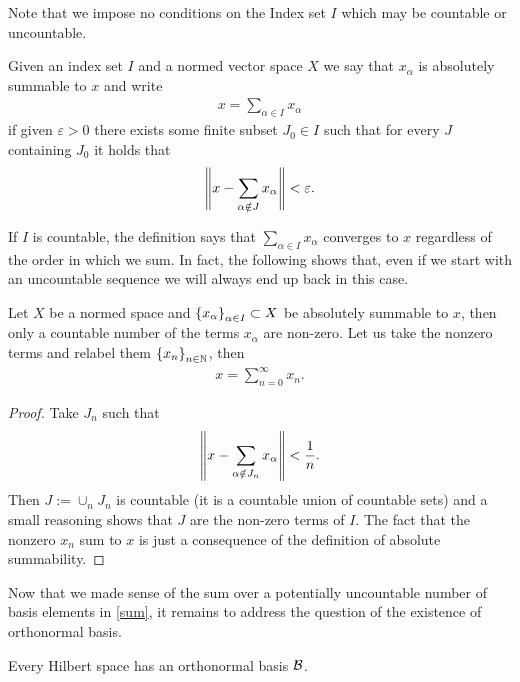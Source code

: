 \documentclass[
    a4paper,
    DIV=14,
    abstract=true,
    numbers=noenddot
]{scrartcl}
\begin{document}
	Note that we impose no conditions on the Index set $I$ which may be countable or uncountable.
	\begin{definition}
		Given an index set $I$ and a normed vector space $X$ we say that $x_\alpha$ is absolutely summable to $x$ and write
		\begin{align*}
			x= \sum_{\alpha\in I}x_\alpha
		\end{align*}
		if given $\varepsilon >0$ there exists some finite subset $J_0 \in I$ such that for every $J$ containing  $J_0$ it holds that
		\begin{align*}
			\left\lVert x-\sum_{\alpha\notin J} x_\alpha \right\rVert<\varepsilon  .
		\end{align*}
	\end{definition}
	If $I$ is countable, the definition says that $\sum_{\alpha \in I} x_\alpha$ converges to $x$ regardless of the order in which we sum. In fact, the following shows that, even if we start with an uncountable sequence we will always end up back in this case.
	\begin{proposition}
		Let $X$  be a normed space and $\left\{x_\alpha\right\}_{\alpha \in I} \subset  X$ be absolutely summable to $x$, then only a countable number of the terms $x_\alpha$ are non-zero. Let us take the nonzero terms and relabel them $\left\{x_n\right\}_{n \in \mathbb{N}} $, then\begin{align*}
			x= \sum_{n=0}^{\infty} x_n.
		\end{align*}
	\end{proposition}
	\begin{proof}
		Take $J_n$ such that
		\begin{align*}
			\left\lVert x-\sum_{ \alpha \notin J_n} x_\alpha \right\rVert< \frac{1}{n}   .
		\end{align*}
		Then $J:= \cup_n J_n$ is countable (it is a countable union of countable sets) and a small reasoning shows that $J $ are the non-zero terms of $I$. The fact that the nonzero $x_n$ sum to  $x$ is just a consequence of the definition of absolute summability.
	\end{proof}
	Now that we made sense of the sum over a potentially uncountable number of basis elements in \eqref{sum}, it remains to address the question of the existence of orthonormal basis.
	\begin{theorem}\label{existence} Every Hilbert space has an orthonormal basis $\mathcal{B}$.
	\end{theorem}
\end{document}
